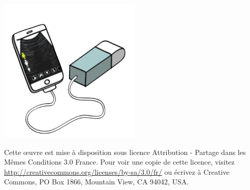 \documentclass[12pt]{article}
\renewcommand{\headrulewidth}{1pt}
\begin{document}
\begin{titlepage}




\includegraphics[scale=.65]{Images_Rapport/sonde2}\par 

\vspace{10pt}
Cette œuvre est mise à disposition sous licence Attribution -  Partage dans les Mêmes Conditions 3.0 France. Pour voir une copie de cette licence, visitez \url{http://creativecommons.org/licenses/by-sa/3.0/fr/} ou écrivez à Creative Commons, PO Box 1866, Mountain View, CA 94042, USA. 

\vfill %

\end{titlepage}

\tableofcontents
\renewcommand{\headrulewidth}{1pt}
\fancyhead[L]{\leftmark}
\end{document}
